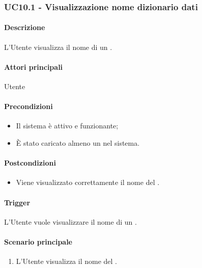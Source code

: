 \subsubsection{UC10.1 - Visualizzazione nome dizionario dati}\label{UC10point1}
\paragraph*{Descrizione}
L'Utente visualizza il nome di un .

\paragraph*{Attori principali}
Utente

\paragraph*{Precondizioni}
\begin{itemize}
  \item Il sistema è attivo e funzionante;
  \item È stato caricato almeno un  nel sistema. 
\end{itemize}

\paragraph*{Postcondizioni}
\begin{itemize}
  \item Viene visualizzato correttamente il nome del .
\end{itemize}

\paragraph*{Trigger}
L'Utente vuole visualizzare il nome di un .

\paragraph*{Scenario principale}
\begin{enumerate}
  \item L'Utente visualizza il nome del .
\end{enumerate}


